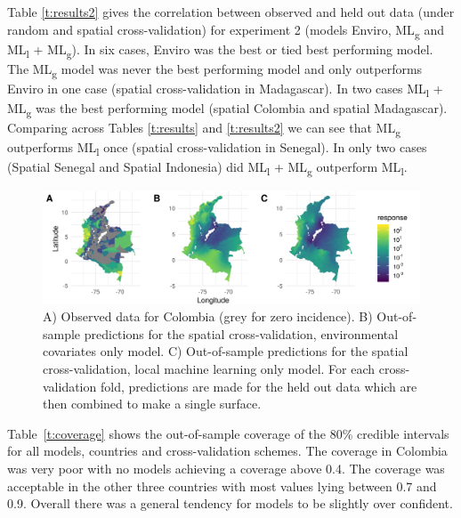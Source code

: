 \documentclass[review]{elsarticle}
\begin{document}
Table \ref{t:results2} gives the correlation between observed and held out data (under random and spatial cross-validation) for experiment 2 (models Enviro, ML\textsubscript{g} and ML\textsubscript{l} + ML\textsubscript{g}).
In six cases, Enviro was the best or tied best performing model.
The ML\textsubscript{g} model was never the best performing model and only outperforms Enviro in one case (spatial cross-validation in Madagascar).
In two cases ML\textsubscript{l} + ML\textsubscript{g} was the best performing model (spatial Colombia and spatial Madagascar).
Comparing across Tables \ref{t:results} and \ref{t:results2} we can see that ML\textsubscript{g} outperforms ML\textsubscript{l} once (spatial cross-validation in Senegal).
In only two cases (Spatial Senegal and Spatial Indonesia) did ML\textsubscript{l} + ML\textsubscript{g} outperform ML\textsubscript{l}.



\begin{figure}[t!]
\centering
\includegraphics[width = 1\textwidth]{figs/col_comparison_map.png} %
\caption{
  A) Observed data for Colombia (grey for zero incidence). B) Out-of-sample predictions for the spatial cross-validation, environmental covariates only model. C) Out-of-sample predictions for the spatial cross-validation, local machine learning only model. For each cross-validation fold, predictions are made for the held out data which are then combined to make a single surface.
}
\label{f:map}
\end{figure}

Table~\ref{t:coverage} shows the out-of-sample coverage of the 80\% credible intervals for all models, countries and cross-validation schemes.
The coverage in Colombia was very poor with no models achieving a coverage above 0.4.
The coverage was acceptable in the other three countries with most values lying between 0.7 and 0.9.
Overall there was a general tendency for models to be slightly over confident.
\end{document}
